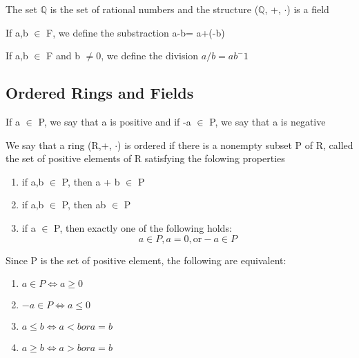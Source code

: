 \documentclass{article}
\begin{document}
\begin{lemma}
    The set $ \mathbb{Q} $ is the set of rational numbers and the structure
    ($ \mathbb{Q} $, +, $\cdot $) is a field
\end{lemma}

\begin{definition}[Substraction]
    If a,b $ \in $ F, we define the substraction a-b= a+(-b)
\end{definition}

\begin{definition}[Division]
    If a,b $ \in $ F and b $\neq$0, we define the division $a/b= ab^-1$
\end{definition}

\subsection{Ordered Rings and Fields}

\begin{definition}
    If a $\in$ P, we say that a is positive and if -a $\in$ P, we say that a is
    negative
\end{definition}

\begin{definition}
    We say that a ring (R,+, $\cdot$) is ordered if there is a nonempty subset
    P of R, called the set of positive elements of R satisfying the folowing
    properties
    \begin{enumerate}
	\item if a,b $\in$ P, then a + b $\in$ P
	\item if a,b $\in$ P, then ab $\in$ P
	\item if a $\in$ P, then exactly one of the following holds:
	    $$ a \in P, a=0, \text{or} -a \in P $$
    \end{enumerate}
\end{definition}

\begin{remark}
    Since P is the set of positive element, the following are equivalent:
    \begin{enumerate}
	\item $a \in P \Longleftrightarrow a \geq 0$
	\item $-a \in P \Longleftrightarrow a \leq 0$
	\item $ a \leq b \Longleftrightarrow a<b or a=b$
	\item $ a \geq b \Longleftrightarrow a>b or a=b$
    \end{enumerate}
\end{remark}
\end{document}
